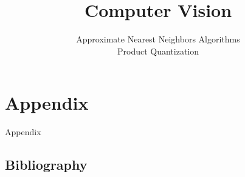 
\title{Computer Vision}
\subtitle{Approximate Nearest Neighbors Algorithms \\ Product Quantization}




	
	
	
%	
	
	
	
	\section*{Appendix}
	\begin{frame}
		\Huge
		Appendix
	\end{frame}
	
	\subsection*{Bibliography}
		
	
		
